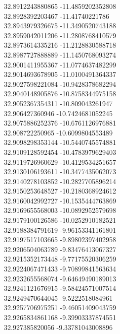 {32.8912243880865	-11.4859202352808\\
32.8928392203467	-11.41740221786\\
32.8943979326675	-11.3490520743188\\
32.8959042011206	-11.2808768410579\\
32.8973614335216	-11.2128830588718\\
32.8987727888889	-11.1450768093274\\
32.9001411955367	-11.0774637482299\\
32.9014693678905	-11.0100491364337\\
32.9027598221084	-10.9428378682294\\
32.9040148905876	-10.8758344975158\\
32.9052367354311	-10.809043261947\\
32.906427360946	-10.7424681052245\\
32.9075886252376	-10.6761126976881\\
32.908722250965	-10.6099804553489\\
32.9098298353144	-10.5440745574881\\
32.9109128592454	-10.4783979629403\\
32.9119726960629	-10.4129534251657\\
32.9130106193611	-10.3477435062073\\
32.9140278103852	-10.2827705896214\\
32.9150253648527	-10.2180368924612\\
32.9160042992727	-10.1535444763869\\
32.9169655568003	-10.0892952579698\\
32.9179100126586	-10.0252910182521\\
32.9188384791619	-9.96153341161801\\
32.9197517103665	-9.89802397402958\\
32.9206504063789	-9.83476413067327\\
32.9215352173448	-9.77175520306259\\
32.9224067471433	-9.70899841563634\\
32.9232655568074	-9.64649490189013\\
32.9241121676915	-9.58424571007514\\
32.9249470644045	-9.5222518084961\\
32.9257706975251	-9.46051409043759\\
32.9265834861168	-9.39903337874551\\
32.927385820056	-9.33781043008896\\
}
